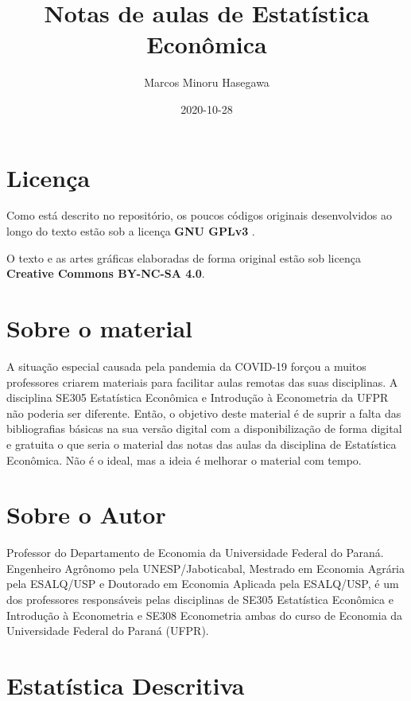 \documentclass[
]{book}
\title{Notas de aulas de Estatística Econômica}
\author{Marcos Minoru Hasegawa}
\date{2020-10-28}
\begin{document}
\maketitle

{
\setcounter{tocdepth}{1}
\tableofcontents
}
\hypertarget{licenuxe7a}{%
\chapter*{Licença}\label{licenuxe7a}}

Como está descrito no repositório, os poucos códigos originais desenvolvidos ao longo do texto estão sob a licença \textbf{GNU GPLv3} .

O texto e as artes gráficas elaboradas de forma original estão sob licença \textbf{Creative Commons BY-NC-SA 4.0}.

\hypertarget{sobre-o-material}{%
\chapter*{Sobre o material}\label{sobre-o-material}}

A situação especial causada pela pandemia da COVID-19 forçou a muitos professores criarem materiais para facilitar aulas remotas das suas disciplinas. A disciplina SE305 Estatística Econômica e Introdução à Econometria da UFPR não poderia ser diferente. Então, o objetivo deste material é de suprir a falta das bibliografias básicas na sua versão digital com a disponibilização de forma digital e gratuita o que seria o material das notas das aulas da disciplina de Estatística Econômica. Não é o ideal, mas a ideia é melhorar o material com tempo.

\hypertarget{sobre-o-autor}{%
\chapter*{Sobre o Autor}\label{sobre-o-autor}}

Professor do Departamento de Economia da Universidade Federal do Paraná. Engenheiro Agrônomo pela UNESP/Jaboticabal, Mestrado em Economia Agrária pela ESALQ/USP e Doutorado em Economia Aplicada pela ESALQ/USP, é um dos professores responsáveis pelas disciplinas de SE305 Estatística Econômica e Introdução à Econometria e SE308 Econometria ambas do curso de Economia da Universidade Federal do Paraná (UFPR).

\hypertarget{estatuxedstica-descritiva}{%
\chapter{Estatística Descritiva}\label{estatuxedstica-descritiva}}
\end{document}
